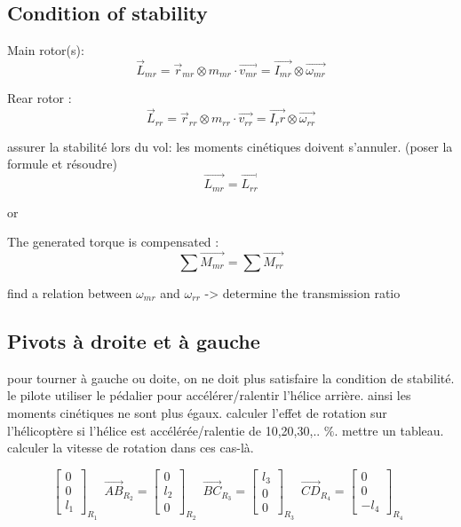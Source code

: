 \documentclass[12pt,a4paper]{article}
\begin{document}
	\subsection{Condition of stability}
	
	Main rotor(s):
	\begin{equation}
		\vec{L}_{mr}=\vec{r}_{mr} \otimes m_{mr} \cdot \vec{v_{mr}}=\vec{I_{mr}} \otimes \vec{\omega_{mr}}
	\end{equation}
	
	
	Rear rotor : 
	\begin{equation}
		\vec{L}_{rr}=\vec{r}_{rr} \otimes m_{rr} \cdot \vec{v_{rr}}=\vec{I_rr} \otimes \vec{\omega_{rr}}
	\end{equation}
	
	assurer la stabilité lors du vol: les moments cinétiques doivent s'annuler. (poser la formule et résoudre)
	\begin{equation}
		\vec{L_{mr}}=\vec{L_{rr}}
	\end{equation}
	
	or
	
	The generated torque is compensated : 
	\begin{equation}
		\sum \vec{M_{mr}}=\sum \vec{M_{rr}}
	\end{equation}
	
	find a relation between $\omega_{mr}$ and $\omega_{rr}$ -> determine the transmission ratio
	
	\subsection{Pivots à droite et à gauche}
	pour tourner à gauche ou doite, on ne doit plus satisfaire la condition de stabilité. le pilote utiliser le pédalier pour accélérer/ralentir l'hélice arrière. ainsi les moments cinétiques ne sont plus égaux.
	\medbreak
	calculer l'effet de rotation sur l'hélicoptère si l'hélice est accélérée/ralentie de 10,20,30,.. $\%$. mettre un tableau. calculer la vitesse de rotation dans ces cas-là. 
	
	
	\begin{equation}
		\begin{bmatrix}
			0 \\
			0\\
			l_1
		\end{bmatrix}_{R_{1}} \enspace
		\vec{AB}_{R_{2}}=
		\begin{bmatrix}
			0 \\
			l_2\\
			0
		\end{bmatrix}_{R_{2}} \enspace
		\vec{BC}_{R_{3}}=
		\begin{bmatrix}
			l_3 \\
			0\\
			0
		\end{bmatrix}_{R_{3}} \enspace
		\vec{CD}_{R_{4}}=
		\begin{bmatrix}
			0 \\
			0\\
			-l_4
		\end{bmatrix}_{R_{4}} \enspace
	\end{equation}
	
\end{document}
